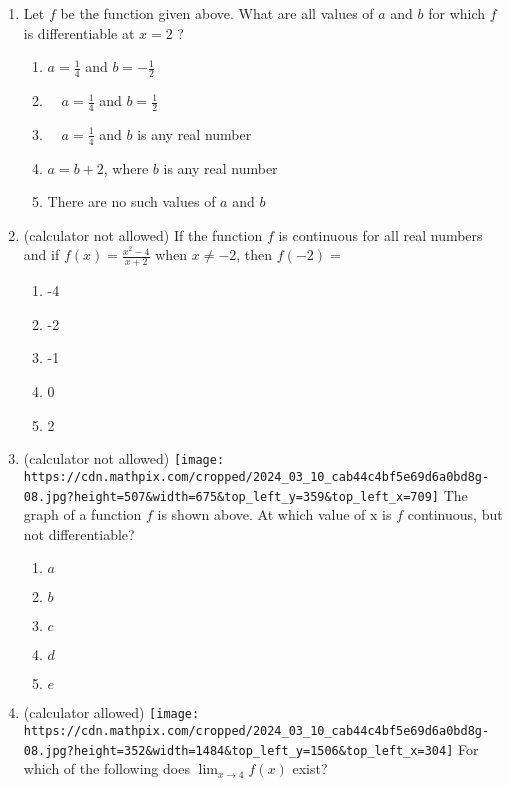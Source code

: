 \documentclass[
]{article}
\providecommand{\tightlist}{%
  \setlength{\itemsep}{0pt}\setlength{\parskip}{0pt}}
\begin{document}
\begin{enumerate}
\def\labelenumi{\arabic{enumi}.}
\setcounter{enumi}{13}
\tightlist
\item
  Let \(f\) be the function given above. What are all values of \(a\)
  and \(b\) for which \(f\) is differentiable at \(x=2\) ?

  \begin{enumerate}
  \def\labelenumii{(\alph{enumii})}
  \tightlist
  \item
    \(a=\frac{1}{4}\) and \(b=-\frac{1}{2}\)
  \item
    \(\quad a=\frac{1}{4}\) and \(b=\frac{1}{2}\)
  \item
    \(\quad a=\frac{1}{4}\) and \(b\) is any real number
  \item
    \(a=b+2\), where \(b\) is any real number
  \item
    There are no such values of \(a\) and \(b\)
  \end{enumerate}
\item
  (calculator not allowed) If the function \(f\) is continuous for all
  real numbers and if \(f(x)=\frac{x^{2}-4}{x+2}\) when \(x \neq-2\),
  then \(f(-2)=\)

  \begin{enumerate}
  \def\labelenumii{(\alph{enumii})}
  \tightlist
  \item
    -4
  \item
    -2
  \item
    -1
  \item
    0
  \item
    2
  \end{enumerate}
\item
  (calculator not allowed)
  \texttt{[image: https://cdn.mathpix.com/cropped/2024\_03\_10\_cab44c4bf5e69d6a0bd8g-08.jpg?height=507\&width=675\&top\_left\_y=359\&top\_left\_x=709]}
  The graph of a function \(f\) is shown above. At which value of
  \(\mathrm{x}\) is \(f\) continuous, but not differentiable?

  \begin{enumerate}
  \def\labelenumii{(\alph{enumii})}
  \tightlist
  \item
    \(a\)
  \item
    \(b\)
  \item
    \(c\)
  \item
    \(d\)
  \item
    \(e\)
  \end{enumerate}
\item
  (calculator allowed)
  \texttt{[image: https://cdn.mathpix.com/cropped/2024\_03\_10\_cab44c4bf5e69d6a0bd8g-08.jpg?height=352\&width=1484\&top\_left\_y=1506\&top\_left\_x=304]}
  For which of the following does \(\lim _{x \rightarrow 4} f(x)\)
  exist?


\end{enumerate}
\end{document}
